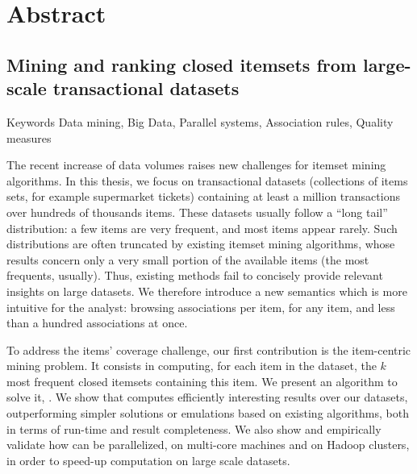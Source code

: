 
{
\newpage
\thispagestyle{empty}
\mbox{}
\newpage
}

\pagestyle{chap}




\section*{Abstract}

\subsection*{Mining and ranking closed itemsets from large-scale transactional datasets}

\begin{paragraph}{Keywords}
  Data mining, Big Data, Parallel systems,
  Association rules,
  Quality measures
\end{paragraph}

The recent increase of data volumes raises new challenges for itemset mining algorithms.
In this thesis, we focus on transactional datasets (collections of items sets, for example supermarket tickets)
containing at least a million transactions over hundreds of thousands items.
These datasets usually follow a ``long tail'' distribution:
a few items are very frequent,
and most items appear rarely.
Such distributions are often truncated by existing itemset mining algorithms,
whose results concern only a very small portion of the available items (the most frequents, usually).
Thus, existing methods fail
to concisely provide relevant insights on large datasets.
We therefore introduce a new semantics which is more intuitive for the analyst:
browsing associations per item, for any item, and less than a hundred associations at once.

To address the items' coverage challenge,
our first contribution is the item-centric mining problem.
It consists in computing, for each item in the dataset,
the $k$ most frequent closed itemsets containing this item.
We present an algorithm to solve it, \toppi.
We show that \toppi computes efficiently interesting results over our datasets,
outperforming simpler solutions
or emulations based on existing algorithms,
both in terms of run-time and result completeness.
We also show and empirically validate how \toppi can be parallelized, on multi-core machines and on Hadoop clusters,
in order to speed-up computation on large scale datasets.

